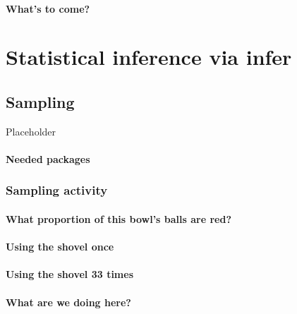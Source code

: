 \documentclass[
  12pt, krantz2,
]{krantz}
\begin{document}
\hypertarget{whats-to-come-5}{%
\subsection{What's to come?}\label{whats-to-come-5}}

\hypertarget{part-statistical-inference-via-infer}{%
\part{Statistical inference via infer}\label{part-statistical-inference-via-infer}}

\hypertarget{sampling}{%
\chapter{Sampling}\label{sampling}}

Placeholder

\hypertarget{needed-packages-5}{%
\subsection*{Needed packages}\label{needed-packages-5}}


\hypertarget{sampling-activity}{%
\section{Sampling activity}\label{sampling-activity}}

\hypertarget{what-proportion-of-this-bowls-balls-are-red}{%
\subsection{What proportion of this bowl's balls are red?}\label{what-proportion-of-this-bowls-balls-are-red}}

\hypertarget{using-the-shovel-once}{%
\subsection{Using the shovel once}\label{using-the-shovel-once}}

\hypertarget{student-shovels}{%
\subsection{Using the shovel 33 times}\label{student-shovels}}

\hypertarget{what-are-we-doing-here}{%
\subsection{What are we doing here?}\label{what-are-we-doing-here}}
\end{document}
